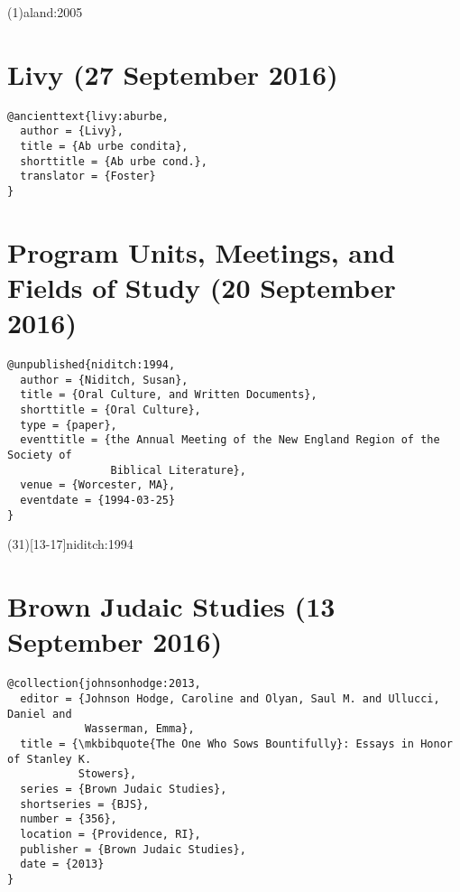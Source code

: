 \documentclass[a4paper]{article}
\begin{document}
\examplecite(1){aland:2005}
\examplebibliography
{}

\section{Livy (27 September 2016)}

\begin{verbatim}
@ancienttext{livy:aburbe,
  author = {Livy},
  title = {Ab urbe condita},
  shorttitle = {Ab urbe cond.},
  translator = {Foster}
}
\end{verbatim}

\exampleabbreviations
{}

\section{Program Units, Meetings, and Fields of Study (20 September 2016)}

\begin{verbatim}
@unpublished{niditch:1994,
  author = {Niditch, Susan},
  title = {Oral Culture, and Written Documents},
  shorttitle = {Oral Culture},
  type = {paper},
  eventtitle = {the Annual Meeting of the New England Region of the Society of
                Biblical Literature},
  venue = {Worcester, MA},
  eventdate = {1994-03-25}
}
\end{verbatim}

\examplecite(31)[13-17]{niditch:1994}
\examplebibliography
{}

\section{Brown Judaic Studies (13 September 2016)}

\begin{verbatim}
@collection{johnsonhodge:2013,
  editor = {Johnson Hodge, Caroline and Olyan, Saul M. and Ullucci, Daniel and
            Wasserman, Emma},
  title = {\mkbibquote{The One Who Sows Bountifully}: Essays in Honor of Stanley K.
           Stowers},
  series = {Brown Judaic Studies},
  shortseries = {BJS},
  number = {356},
  location = {Providence, RI},
  publisher = {Brown Judaic Studies},
  date = {2013}
}
\end{verbatim}
\end{document}
